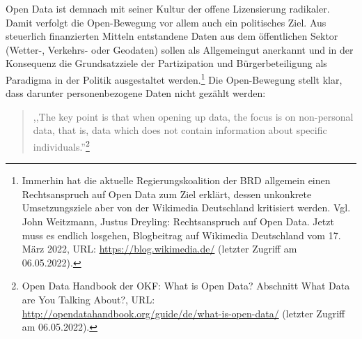 Open Data ist demnach mit seiner Kultur der offene Lizensierung radikaler. Damit verfolgt die Open-Bewegung vor allem auch ein politisches Ziel. Aus steuerlich finanzierten Mitteln entstandene Daten aus dem öffentlichen Sektor (Wetter-, Verkehrs- oder Geodaten) sollen als Allgemeingut anerkannt und in der Konsequenz die Grundsatzziele der Partizipation und Bürgerbeteiligung als Paradigma in der Politik ausgestaltet werden.\footnote{Immerhin hat die aktuelle Regierungskoalition der BRD allgemein einen Rechtsanspruch auf Open Data zum Ziel erklärt, dessen unkonkrete Umsetzungsziele aber von der Wikimedia Deutschland kritisiert werden. Vgl. John Weitzmann, 
Justus Dreyling: Rechtsanspruch auf Open Data. Jetzt muss es endlich losgehen, Blogbeitrag auf Wikimedia Deutschland vom 17. März 2022, URL: \url{https://blog.wikimedia.de/} (letzter Zugriff am 06.05.2022).} Die Open-Bewegung stellt klar, dass darunter personenbezogene Daten nicht gezählt werden:

\begin{quote}
,,The key point is that when opening up data, the focus is on non-personal data, that is, data which does not contain information about specific individuals.''\footnote{Open Data Handbook der OKF: What is Open Data? Abschnitt What Data are You Talking About?, URL: \url{http://opendatahandbook.org/guide/de/what-is-open-data/} (letzter Zugriff am 06.05.2022).}
\end{quote} 

